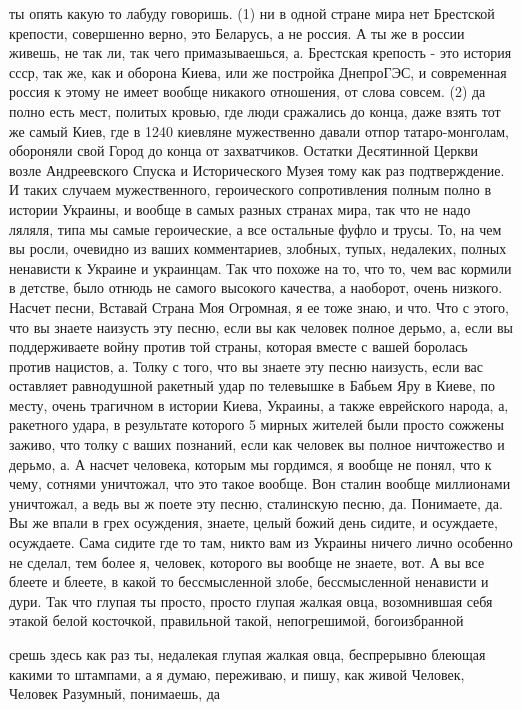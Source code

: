 ты опять какую то лабуду говоришь. (1) ни в одной стране мира нет Брестской
крепости, совершенно верно, это Беларусь, а не россия. А ты же в россии живешь,
не так ли, так чего примазываешься, а. Брестская крепость - это история ссср,
так же, как и оборона Киева, или же постройка ДнепроГЭС, и современная россия к
этому не имеет вообще никакого отношения, от слова совсем. (2) да полно есть
мест, политых кровью, где люди сражались до конца, даже взять тот же самый
Киев, где в 1240 киевляне мужественно давали отпор татаро-монголам, обороняли
свой Город до конца от захватчиков. Остатки Десятинной Церкви возле
Андреевского Спуска и Исторического Музея тому как раз подтверждение. И таких
случаем мужественного, героического сопротивления полным полно в истории
Украины, и вообще в самых разных странах мира, так что не надо ляляля, типа мы
самые героические, а все остальные фуфло и трусы. То, на чем вы росли, очевидно
из ваших комментариев, злобных, тупых, недалеких, полных ненависти к Украине и
украинцам. Так что похоже на то, что то, чем вас кормили в детстве, было отнюдь
не самого высокого качества, а наоборот, очень низкого. Насчет песни, Вставай
Страна Моя Огромная, я ее тоже знаю, и что. Что с этого, что вы знаете наизусть
эту песню, если вы как человек полное дерьмо, а, если вы поддерживаете войну
против той страны, которая вместе с вашей боролась против нацистов, а. Толку с
того, что вы знаете эту песню наизусть, если вас оставляет равнодушной ракетный
удар по телевышке в Бабьем Яру в Киеве, по месту, очень трагичном в истории
Киева, Украины, а также еврейского народа, а, ракетного удара, в результате
которого 5 мирных жителей были просто сожжены заживо, что толку с ваших
познаний, если как человек вы полное ничтожество и дерьмо, а. А насчет
человека, которым мы гордимся, я вообще не понял, что к чему, сотнями
уничтожал, что это такое вообще. Вон сталин вообще миллионами уничтожал, а ведь
вы ж поете эту песню, сталинскую песню, да. Понимаете, да. Вы же впали в грех
осуждения, знаете, целый божий день сидите, и осуждаете, осуждаете. Сама сидите
где то там, никто вам из Украины ничего лично особенно не сделал, тем более я,
человек, которого вы вообще не знаете, вот. А вы все блеете и блеете, в какой
то бессмысленной злобе, бессмысленной ненависти и дури. Так что глупая ты
просто, просто глупая жалкая овца, возомнившая себя этакой белой косточкой,
правильной такой, непогрешимой, богоизбранной 

срешь здесь как раз ты, недалекая глупая жалкая овца, беспрерывно блеющая
какими то штампами, а я думаю, переживаю, и пишу, как живой Человек, Человек
Разумный, понимаешь, да

